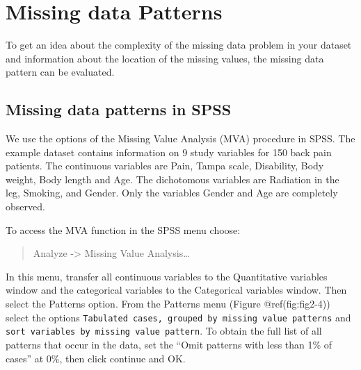 \documentclass[
]{book}
\begin{document}
\hypertarget{missing-data-patterns}{%
\section{Missing data Patterns}\label{missing-data-patterns}}

To get an idea about the complexity of the missing data problem in your
dataset and information about the location of the missing values, the
missing data pattern can be evaluated.

\hypertarget{missing-data-patterns-in-spss}{%
\subsection{Missing data patterns in
SPSS}\label{missing-data-patterns-in-spss}}

We use the options of the Missing Value Analysis (MVA) procedure in
SPSS. The example dataset contains information on 9 study variables for
150 back pain patients. The continuous variables are Pain, Tampa scale,
Disability, Body weight, Body length and Age. The dichotomous variables
are Radiation in the leg, Smoking, and Gender. Only the variables Gender
and Age are completely observed.

To access the MVA function in the SPSS menu choose:

\begin{quote}
Analyze -\textgreater{} Missing Value Analysis\ldots{}
\end{quote}

In this menu, transfer all continuous variables to the Quantitative
variables window and the categorical variables to the Categorical
variables window. Then select the Patterns option. From the Patterns
menu (Figure @ref(fig:fig2-4)) select the options
\texttt{Tabulated\ cases,\ grouped\ by\ missing\ value\ patterns} and
\texttt{sort\ variables\ by\ missing\ value\ pattern}. To obtain the
full list of all patterns that occur in the data, set the ``Omit
patterns with less than 1\% of cases'' at 0\%, then click continue and
OK.
\end{document}
